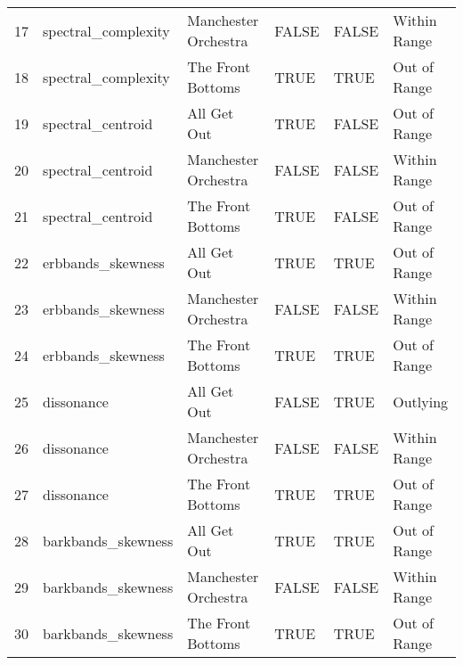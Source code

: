 \documentclass{article}\usepackage[]{graphicx}\usepackage[]{xcolor}
\begin{document}
\begin{table}[htbp]
\begin{tabular}{rlllll}
  17 & spectral\_complexity & Manchester Orchestra & FALSE & FALSE & Within Range \\ 
  18 & spectral\_complexity & The Front Bottoms & TRUE & TRUE & Out of Range \\ 
  19 & spectral\_centroid & All Get Out & TRUE & FALSE & Out of Range \\ 
  20 & spectral\_centroid & Manchester Orchestra & FALSE & FALSE & Within Range \\ 
  21 & spectral\_centroid & The Front Bottoms & TRUE & FALSE & Out of Range \\ 
  22 & erbbands\_skewness & All Get Out & TRUE & TRUE & Out of Range \\ 
  23 & erbbands\_skewness & Manchester Orchestra & FALSE & FALSE & Within Range \\ 
  24 & erbbands\_skewness & The Front Bottoms & TRUE & TRUE & Out of Range \\ 
  25 & dissonance & All Get Out & FALSE & TRUE & Outlying \\ 
  26 & dissonance & Manchester Orchestra & FALSE & FALSE & Within Range \\ 
  27 & dissonance & The Front Bottoms & TRUE & TRUE & Out of Range \\ 
  28 & barkbands\_skewness & All Get Out & TRUE & TRUE & Out of Range \\ 
  29 & barkbands\_skewness & Manchester Orchestra & FALSE & FALSE & Within Range \\ 
  30 & barkbands\_skewness & The Front Bottoms & TRUE & TRUE & Out of Range \\ 
   \hline
\end{tabular}
\endgroup
\end{table}
\end{document}

